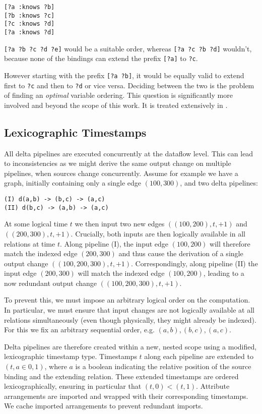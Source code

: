 \documentclass[../index.tex]{subfiles}
\begin{document}
\begin{verbatim}
[?a :knows ?b]
[?b :knows ?c]
[?c :knows ?d]
[?a :knows ?d]
\end{verbatim}

\texttt{[?a ?b ?c ?d ?e]} would be a suitable order, whereas
\texttt{[?a ?c ?b ?d]} wouldn't, because none of the bindings can
extend the prefix \texttt{[?a]} to \texttt{?c}.

However starting with the prefix \texttt{[?a ?b]}, it would be equally
valid to extend first to \texttt{?c} and then to \texttt{?d} or vice
versa. Deciding between the two is the problem of finding an
\emph{optimal} variable ordering. This question is significantly more
involved and beyond the scope of this work. It is treated extensively
in \cite{abo2016faq}.

\subsection{Lexicographic Timestamps} \label{impl-altneu}

All delta pipelines are executed concurrently at the dataflow
level. This can lead to inconsistencies as we might derive the same
output change on multiple pipelines, when sources change
concurrently. Assume for example we have a graph, initially containing
only a single edge $(100,300)$, and two delta pipelines:

\begin{verbatim}
(I) d(a,b) -> (b,c) -> (a,c)
(II) d(b,c) -> (a,b) -> (a,c)
\end{verbatim}

At some logical time $t$ we then input two new edges
$((100,200),t,+1)$ and $((200,300),t,+1)$. Crucially, both inputs are
then logically available in all relations at time $t$. Along pipeline
(I), the input edge $(100,200)$ will therefore match the indexed edge
$(200,300)$ and thus cause the derivation of a single output change
$((100,200,300),t,+1)$. Correspondingly, along pipeline (II) the input
edge $(200,300)$ will match the indexed edge $(100,200)$, leading to a
now redundant output change $((100,200,300),t,+1)$.

To prevent this, we must impose an arbitrary logical order on the
computation. In particular, we must ensure that input changes are not
logically available at all relations simultaneously (even though
physically, they might already be indexed). For this we fix an
arbitrary sequential order, e.g. $(a,b),(b,c),(a,c)$.

Delta pipelines are therefore created within a new, nested scope using
a modified, lexicographic timestamp type. Timestamps $t$ along each
pipeline are extended to $(t,a \in {0,1})$, where $a$ is a boolean
indicating the relative position of the source binding and the
extending relation. These extended timestamps are ordered
lexicographically, ensuring in particular that $(t,0) <
(t,1)$. Attribute arrangements are imported and wrapped with their
corresponding timestamps. We cache imported arrangements to prevent
redundant imports.
\end{document}
